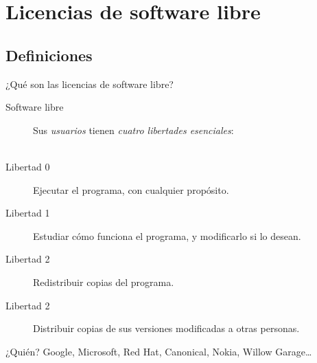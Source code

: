 
%

\begin{frame}[t,plain]
  \maketitle
\end{frame}

\begin{frame}
  \tableofcontents
\end{frame}

\section{Licencias de software libre}

  \begin{frame}
    \tableofcontents[currentsection]
  \end{frame}

%
\subsection{Definiciones}

  \begin{frame}{¿Qué son las licencias de software libre?}
    \begin{description}
      \item[Software libre] Sus \emph{usuarios} tienen \emph{\alert{cuatro libertades esenciales}}:\\~\\
      \item[Libertad 0] Ejecutar el programa, con cualquier propósito.
      \item[Libertad 1] Estudiar cómo funciona el programa, y modificarlo si lo desean.
      \item[Libertad 2] Redistribuir copias del programa.
      \item[Libertad 2] Distribuir copias de sus versiones modificadas a otras personas. 
    \end{description}
    \begin{block}{¿Quién?}
      Google, Microsoft, Red Hat, Canonical, Nokia, Willow Garage\dots
    \end{block}
  \end{frame}

